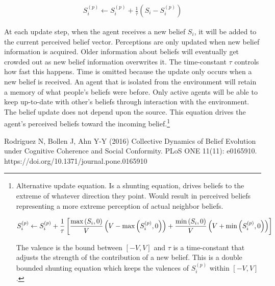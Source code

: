 \documentclass[11pt, a4paper]{article}
\begin{document}
\begin{eqnarray}
S_i^{(p)}\leftarrow S_i^{(p)} + \frac{1}{\tau}\left ( S_i -  S_i^{(p)} \right)
\end{eqnarray}

At each update step, when the agent receives a new belief $S_i$, it will be added to the current perceived belief vector. Perceptions are only updated when new belief information is acquired. Older information about beliefs will eventually get crowded out as new belief information overwrites it. The time-constant $\tau$ controls how fast this happens. Time is omitted because the update only occurs when a new belief is received. An agent that is isolated from the environment will retain a memory of what people's beliefs were before. Only active agents will be able to keep up-to-date with other's beliefs through interaction with the environment. The belief update does not depend upon the source. This equation drives the agent's perceived beliefs toward the incoming belief.\footnote{Alternative update equation. Is a shunting equation, drives beliefs to the extreme of whatever direction they point. Would result in perceived beliefs representing a more extreme perception of actual neighbor beliefs.

\begin{eqnarray}
S_i^{(p)}\leftarrow S_i^{(p)} + \frac{1}{\tau}\left [ \frac{\textup{max}\left( S_i,0 \right )}{V} \left( V - \textup{max}\left( S_i^{(p)},0\right ) \right ) + \frac{\textup{min}\left( S_i,0 \right )}{V} \left( V + \textup{min}\left( S_i^{(p)},0\right ) \right )\right ]
\end{eqnarray}

The valence is the bound between $[-V,V]$ and $\tau$ is a time-constant that adjusts the strength of the contribution of a new belief. This is a double bounded shunting equation which keeps the valences of $S_i^{(p)}$ within $[-V,V]$.}

\begin{thebibliography}{1}
 Rodriguez N, Bollen J, Ahn Y-Y (2016) Collective Dynamics of Belief Evolution under Cognitive Coherence and Social Conformity. PLoS ONE 11(11): e0165910. https://doi.org/10.1371/journal.pone.0165910
\end{thebibliography}
\end{document}
